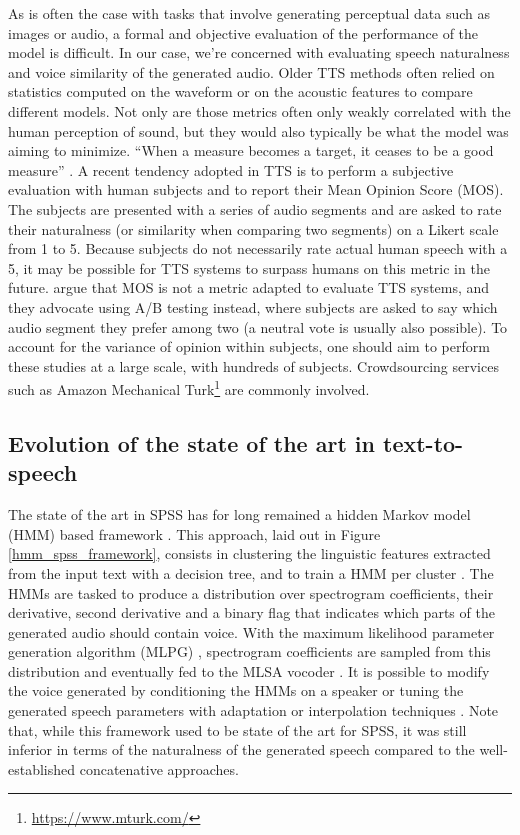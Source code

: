 \documentclass[a4paper, oneside, 12pt, english]{article}
\begin{document}
As is often the case with tasks that involve generating perceptual data such as images or audio, a formal and objective evaluation of the performance of the model is difficult. In our case, we're concerned with evaluating speech naturalness and voice similarity of the generated audio. Older TTS methods often relied on statistics computed on the waveform or on the acoustic features to compare different models. Not only are those metrics often only weakly correlated with the human perception of sound, but they would also typically be what the model was aiming to minimize. ``When a measure becomes a target, it ceases to be a good measure'' \citep{WhenAMetric}. A recent tendency adopted in TTS is to perform a subjective evaluation with human subjects and to report their Mean Opinion Score (MOS). The subjects are presented with a series of audio segments and are asked to rate their naturalness (or similarity when comparing two segments) on a Likert scale from 1 to 5. Because subjects do not necessarily rate actual human speech with a 5, it may be possible for TTS systems to surpass humans on this metric in the future. \citep{MOSNaturalness} argue that MOS is not a metric adapted to evaluate TTS systems, and they advocate using A/B testing instead, where subjects are asked to say which audio segment they prefer among two (a neutral vote is usually also possible). To account for the variance of opinion within subjects, one should aim to perform these studies at a large scale, with hundreds of subjects. Crowdsourcing services such as Amazon Mechanical Turk\footnote{\url{https://www.mturk.com/}} are commonly involved. 



\subsection{Evolution of the state of the art in text-to-speech}
The state of the art in SPSS has for long remained a hidden Markov model (HMM) based framework \citep{Tokuda-2013}. This approach, laid out in Figure \ref{hmm_spss_framework}, consists in clustering the linguistic features extracted from the input text with a decision tree, and to train a HMM per cluster \citep{HMMTTS}. The HMMs are tasked to produce a distribution over spectrogram coefficients, their derivative, second derivative and a binary flag that indicates which parts of the generated audio should contain voice. With the maximum likelihood parameter generation algorithm (MLPG) \citep{Tokuda-2000}, spectrogram coefficients are sampled from this distribution and eventually fed to the MLSA vocoder \citep{MLSA}. It is possible to modify the voice generated by conditioning the HMMs on a speaker or tuning the generated speech parameters with adaptation or interpolation techniques \citep{HMMSpeakerInterpolation}. Note that, while this framework used to be state of the art for SPSS, it was still inferior in terms of the naturalness of the generated speech compared to the well-established concatenative approaches.
\end{document}

